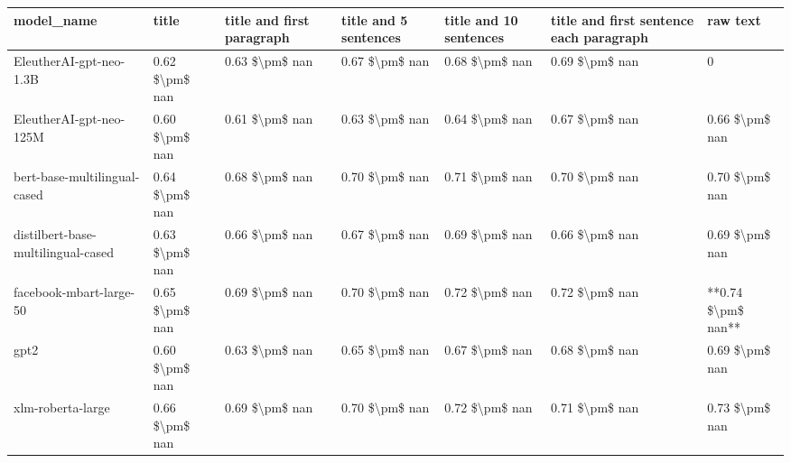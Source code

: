 \begin{tabular}{lllllll}
\toprule
                        model\_name &          title & title and first paragraph & title and 5 sentences & title and 10 sentences & title and first sentence each paragraph &           raw text \\
\midrule
           EleutherAI-gpt-neo-1.3B & 0.62 \$\textbackslash pm\$ nan &            0.63 \$\textbackslash pm\$ nan &        0.67 \$\textbackslash pm\$ nan &         0.68 \$\textbackslash pm\$ nan &                          0.69 \$\textbackslash pm\$ nan &                  0 \\
           EleutherAI-gpt-neo-125M & 0.60 \$\textbackslash pm\$ nan &            0.61 \$\textbackslash pm\$ nan &        0.63 \$\textbackslash pm\$ nan &         0.64 \$\textbackslash pm\$ nan &                          0.67 \$\textbackslash pm\$ nan &     0.66 \$\textbackslash pm\$ nan \\
      bert-base-multilingual-cased & 0.64 \$\textbackslash pm\$ nan &            0.68 \$\textbackslash pm\$ nan &        0.70 \$\textbackslash pm\$ nan &         0.71 \$\textbackslash pm\$ nan &                          0.70 \$\textbackslash pm\$ nan &     0.70 \$\textbackslash pm\$ nan \\
distilbert-base-multilingual-cased & 0.63 \$\textbackslash pm\$ nan &            0.66 \$\textbackslash pm\$ nan &        0.67 \$\textbackslash pm\$ nan &         0.69 \$\textbackslash pm\$ nan &                          0.66 \$\textbackslash pm\$ nan &     0.69 \$\textbackslash pm\$ nan \\
           facebook-mbart-large-50 & 0.65 \$\textbackslash pm\$ nan &            0.69 \$\textbackslash pm\$ nan &        0.70 \$\textbackslash pm\$ nan &         0.72 \$\textbackslash pm\$ nan &                          0.72 \$\textbackslash pm\$ nan & **0.74 \$\textbackslash pm\$ nan** \\
                              gpt2 & 0.60 \$\textbackslash pm\$ nan &            0.63 \$\textbackslash pm\$ nan &        0.65 \$\textbackslash pm\$ nan &         0.67 \$\textbackslash pm\$ nan &                          0.68 \$\textbackslash pm\$ nan &     0.69 \$\textbackslash pm\$ nan \\
                 xlm-roberta-large & 0.66 \$\textbackslash pm\$ nan &            0.69 \$\textbackslash pm\$ nan &        0.70 \$\textbackslash pm\$ nan &         0.72 \$\textbackslash pm\$ nan &                          0.71 \$\textbackslash pm\$ nan &     0.73 \$\textbackslash pm\$ nan \\
\bottomrule
\end{tabular}
